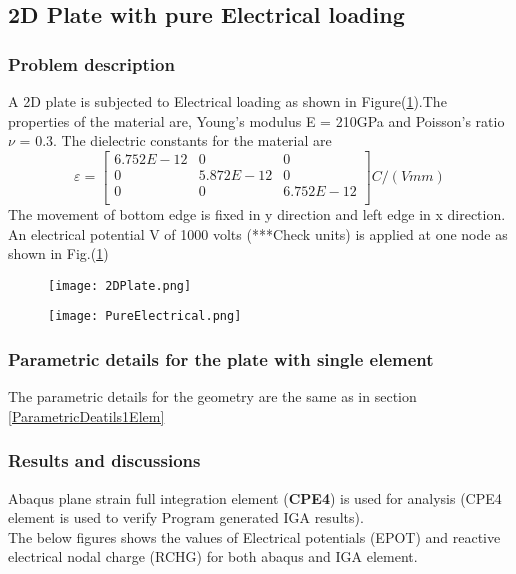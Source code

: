 \documentclass[11pt]{article}
\begin{document}
\subsection{2D Plate with pure Electrical loading}
\subsubsection{Problem description}
A 2D plate is subjected to Electrical loading as shown in Figure(\ref{PureElectrical}).The properties of the material are, Young’s modulus E = 210GPa and Poisson's ratio $\nu$ = 0.3.
The dielectric constants for the material are
$$
\varepsilon = \begin{bmatrix}
6.752E-12 & 0 & 0 \\
0 & 5.872E-12 & 0 \\
0 & 0 & 6.752E-12\\
\end{bmatrix} C/(V mm)
$$ 
The movement of bottom edge is fixed in y direction and left edge in x direction. An electrical potential V of 1000 volts (***Check units) is applied at one node as shown in Fig.(\ref{PureElectrical})
\begin{figure}[H]
	\centering
	\begin{minipage}{.5\textwidth}
		\centering
		\texttt{[image: 2DPlate.png]}
		\label{2Dplate}
	\end{minipage}%
	\begin{minipage}{.5\textwidth}
		\centering
		\texttt{[image: PureElectrical.png]}
		\label{PureElectrical}
	\end{minipage}
\end{figure}
\subsubsection{Parametric details for the plate with single element}


The parametric details for the geometry are the same as in section \hyperref[ParametricDeatils1Elem]{\ref{ParametricDeatils1Elem}}

\subsubsection{Results and discussions}
Abaqus plane strain full integration element (\textbf{CPE4}) is used for analysis (CPE4 element is used to verify Program generated IGA results). 
\\The below figures shows the values of Electrical potentials (EPOT) and reactive electrical nodal charge (RCHG) for both abaqus and IGA element.\\
\end{document}
